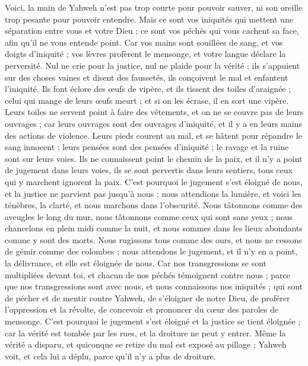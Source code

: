 \begin{multicols}{2}
\VerseOne{}Voici, la main de Yahweh n'est pas trop courte pour pouvoir sauver, ni son oreille trop pesante pour pouvoir entendre.
Mais ce sont vos iniquités qui mettent une séparation entre vous et votre Dieu ; ce sont vos péchés qui vous cachent sa face, afin qu'il ne vous entende point.
Car vos mains sont souillées de sang, et vos doigts d'iniquité ; vos lèvres profèrent le mensonge, et votre langue déclare la perversité.
Nul ne crie pour la justice, nul ne plaide pour la vérité ; ils s'appuient sur des choses vaines et disent des faussetés, ils conçoivent le mal et enfantent l'iniquité.
Ils font éclore des œufs de vipère, et ils tissent des toiles d'araignée ; celui qui mange de leurs œufs meurt ; et si on les écrase, il en sort une vipère.
Leurs toiles ne servent point à faire des vêtements, et on ne se couvre pas de leurs ouvrages ; car leurs ouvrages sont des ouvrages d'iniquité, et il y a en leurs mains des actions de violence.
Leurs pieds courent au mal, et se hâtent pour répandre le sang innocent ; leurs pensées sont des pensées d'iniquité ; le ravage et la ruine sont sur leurs voies.
Ils ne connaissent point le chemin de la paix, et il n'y a point de jugement dans leurs voies, ils se sont pervertis dans leurs sentiers, tous ceux qui y marchent ignorent la paix.
C'est pourquoi le jugement s'est éloigné de nous, et la justice ne parvient pas jusqu'à nous ; nous attendions la lumière, et voici les ténèbres, la clarté, et nous marchons dans l'obscurité.
Nous tâtonnons comme des aveugles le long du mur, nous tâtonnons comme ceux qui sont sans yeux ; nous chancelons en plein midi comme la nuit, et nous sommes dans les lieux abondants comme y sont des morts.
Nous rugissons tous comme des ours, et nous ne cessons de gémir comme des colombes ; nous attendons le jugement, et il n'y en a point, la délivrance, et elle est éloignée de nous.
Car nos transgressions se sont multipliées devant toi, et chacun de nos péchés témoignent contre nous ; parce que nos transgressions sont avec nous, et nous connaissons nos iniquités ;
qui sont de pécher et de mentir contre Yahweh, de s'éloigner de notre Dieu, de proférer l'oppression et la révolte, de concevoir et prononcer du cœur des paroles de mensonge.
C'est pourquoi le jugement s'est éloigné et la justice se tient éloignée ; car la vérité est tombée par les rues, et la droiture ne peut y entrer.
Même la vérité a disparu, et quiconque se retire du mal est exposé au pillage ; Yahweh voit, et cela lui a déplu, parce qu'il n'y a plus de droiture.

\end{multicols}
